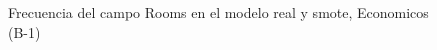\begin{figure}[H]
    \centering
    
    \caption{Frecuencia del campo Rooms en el modelo real y smote, Economicos (B-1)}
    \label{frecuency-Rooms-smote-enc}
\end{figure}